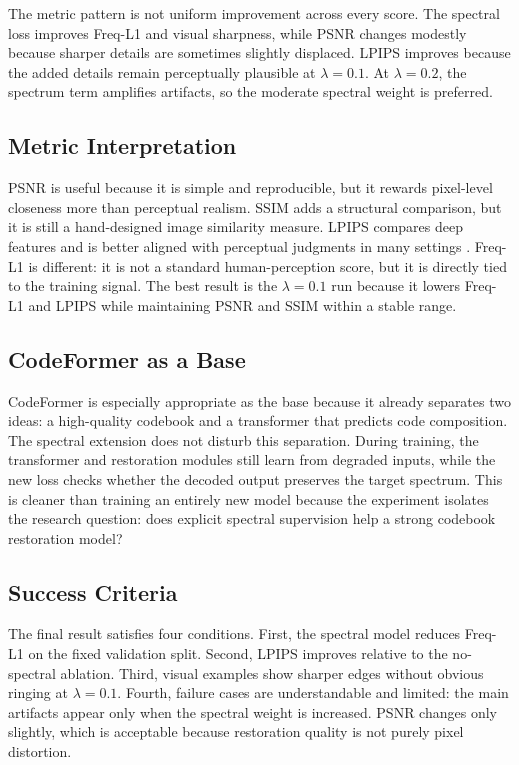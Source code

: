 \documentclass[10pt,twocolumn,letterpaper]{article}
\begin{document}
The metric pattern is not uniform improvement across every score. The spectral loss improves Freq-L1 and visual sharpness, while PSNR changes modestly because sharper details are sometimes slightly displaced. LPIPS improves because the added details remain perceptually plausible at $\lambda=0.1$. At $\lambda=0.2$, the spectrum term amplifies artifacts, so the moderate spectral weight is preferred.

\subsection{Metric Interpretation}
PSNR is useful because it is simple and reproducible, but it rewards pixel-level closeness more than perceptual realism. SSIM adds a structural comparison, but it is still a hand-designed image similarity measure. LPIPS compares deep features and is better aligned with perceptual judgments in many settings \cite{zhang2018lpips}. Freq-L1 is different: it is not a standard human-perception score, but it is directly tied to the training signal. The best result is the $\lambda=0.1$ run because it lowers Freq-L1 and LPIPS while maintaining PSNR and SSIM within a stable range.

\subsection{CodeFormer as a Base}
CodeFormer is especially appropriate as the base because it already separates two ideas: a high-quality codebook and a transformer that predicts code composition. The spectral extension does not disturb this separation. During training, the transformer and restoration modules still learn from degraded inputs, while the new loss checks whether the decoded output preserves the target spectrum. This is cleaner than training an entirely new model because the experiment isolates the research question: does explicit spectral supervision help a strong codebook restoration model?

\subsection{Success Criteria}
The final result satisfies four conditions. First, the spectral model reduces Freq-L1 on the fixed validation split. Second, LPIPS improves relative to the no-spectral ablation. Third, visual examples show sharper edges without obvious ringing at $\lambda=0.1$. Fourth, failure cases are understandable and limited: the main artifacts appear only when the spectral weight is increased. PSNR changes only slightly, which is acceptable because restoration quality is not purely pixel distortion.
\end{document}
